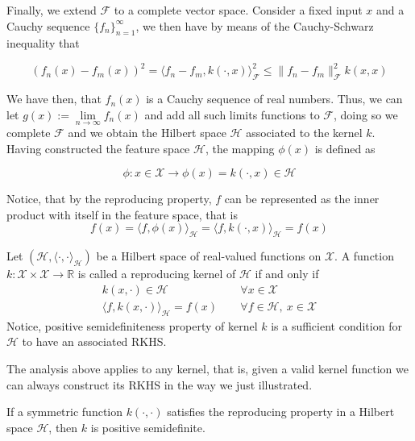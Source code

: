 Finally, we extend $\mathcal{F}$ to a complete vector space.
Consider a fixed input $x$ and a Cauchy sequence $\{f_n\}_{n=1}^{\infty}$, we then have by means of the Cauchy-Schwarz inequality that 

\begin{equation}
    (f_n(x)- f_m(x))^2=\langle f_n-f_m, k(\cdot, x)\rangle_{\mathcal{F}}^2 \leq \| f_n - f_m \|_{\mathcal{F}}^2 k(x,x)    
\end{equation}

We have then, that $f_n(x)$ is a Cauchy sequence of real numbers. Thus, we can let $g(x):=\underset{n\to \infty}\lim f_n(x)$ and add all such limits functions to $\mathcal{F}$, doing so we complete $\mathcal{F}$ and we obtain the Hilbert space $\mathcal{H}$ associated to the kernel $k$.
Having constructed the feature space $\mathcal{H}$, the mapping $\phi(x)$ is defined as

\begin{equation}
    \phi: x \in \mathcal{X} \to \phi(x)=k(\cdot, x) \in \mathcal{H}
\end{equation}

Notice, that by the reproducing property, $f$ can be represented as the inner product with itself in the feature space, that is 
\begin{equation}
    f(x)=\langle f, \phi(x)\rangle_{\mathcal{H}}=\langle f, k(\cdot, x)\rangle_{\mathcal{H}}=f(x)
\end{equation}

\begin{definition}
    Let $(\mathcal{H}, \langle \cdot, \cdot \rangle_\mathcal{H})$ be a Hilbert space of real-valued functions on $\mathcal{X}$. A function $k: \mathcal{X} \times \mathcal{X} \to \mathbb{R}$ is called a reproducing kernel of $\mathcal{H}$ if and only if 
     \begin{align}
        k(x, \cdot) \in \mathcal{H} &\quad \ \forall x \in \mathcal{X}    \\
        \langle  f, k(x, \cdot) \rangle_\mathcal{H} = f(x) &\quad \ \forall f\in \mathcal{H}, \ x \in \mathcal{X}
    \end{align}
    Notice, positive semidefiniteness property of kernel $k$ is a sufficient condition for $\mathcal{H}$ to have an associated RKHS.
\end{definition}

The analysis above applies to any kernel, that is, given a valid kernel function we can always construct its RKHS in the way we just illustrated.
\begin{theorem}
    If a symmetric function $k(\cdot, \cdot)$ satisfies the reproducing property in a Hilbert space $\mathcal{H}$, then $k$ is positive semidefinite.
\end{theorem}

